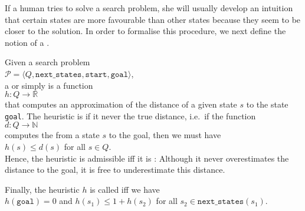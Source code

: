 If a human tries to solve a search
problem, she will usually develop an intuition that certain states are more favourable than other states because
they seem to be closer to the solution.  In order to formalise this procedure, we next define the notion of a
. 

\begin{Definition}
Given a search problem
\\[0.2cm]
\hspace*{1.3cm}
$\mathcal{P} = \langle Q, \mathtt{next\_states}, \mathtt{start}, \mathtt{goal} \rangle$,
\\[0.2cm]
a  or simply  is a function 
\\[0.2cm]
\hspace*{1.3cm}
$h: Q \rightarrow \mathbb{R}$
\\[0.2cm]
that computes an approximation of the distance of a given state $s$ to the state \texttt{goal}.
The heuristic is   if it never
\underline{\color{red}{overestimates}} the true distance, i.e.~if the function 
\\[0.2cm]
\hspace*{1.3cm}
$d:Q \rightarrow \mathbb{N}$
\\[0.2cm]
computes the  from a state $s$ to the goal, then we must have
\\[0.2cm]
\hspace*{1.3cm}
$h(s) \leq d(s)$ \quad for all $s \in Q$.
\\[0.2cm]
Hence, the heuristic is admissible iff it is : 
Although it never overestimates the distance to the goal, it is free to underestimate this distance.

Finally, the  heuristic $h$ is called   iff we have 
\\[0.2cm]
\hspace*{1.3cm}
$h(\mathtt{goal}) = 0$ \quad and \quad $h(s_1) \leq 1 + h(s_2)$ \quad for all $s_2 \in \mathtt{next\_states}(s_1)$.  \eod
\end{Definition}

